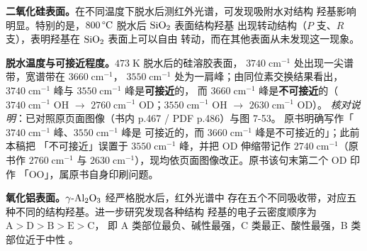 \begin{obs}
\textbf{二氧化硅表面。}在不同温度下脱水后测红外光谱，可发现吸附水对结构
羟基影响明显。特别的是，$800\,\degC$ 脱水后 $\ce{SiO2}$ 表面结构羟基
出现转动结构（$P$ 支、$R$ 支），表明羟基在 $\ce{SiO2}$ 表面上可以自由
转动，而在其他表面从未发现这一现象。

\textbf{脱水温度与可接近程度。}$473\;\mathrm{K}$ 脱水后的硅溶胶表面，
$3740\;\mathrm{cm^{-1}}$ 处出现一尖谱带，宽谱带在 $3660\;\mathrm{cm^{-1}}$，
$3550\;\mathrm{cm^{-1}}$ 处为一肩峰；由同位素交换结果看出，
$3740\;\mathrm{cm^{-1}}$ 峰与 $3550\;\mathrm{cm^{-1}}$ 峰是\textbf{可接近}的，
而 $3660\;\mathrm{cm^{-1}}$ 峰是\textbf{不可接近}的（$3740\;\mathrm{cm^{-1}}$
OH $\to$ $2760\;\mathrm{cm^{-1}}$ OD；$3550\;\mathrm{cm^{-1}}$ OH $\to$
$2630\;\mathrm{cm^{-1}}$ OD）。
\emph{核对说明}：已对照原页面图像（书内 p.467 / PDF p.486）与图 7-53。
原书明确写作「$3740\;\mathrm{cm^{-1}}$ 峰、$3550\;\mathrm{cm^{-1}}$ 峰是
可接近的，而 $3660\;\mathrm{cm^{-1}}$ 峰是不可接近的」；此前本稿把
「不可接近」误置于 $3550\;\mathrm{cm^{-1}}$ 峰，并把 OD 伸缩带记作
$2740\;\mathrm{cm^{-1}}$（原书作 $2760\;\mathrm{cm^{-1}}$ 与
$2630\;\mathrm{cm^{-1}}$），现均依页面图像改正。原书该句末第二个 OD 印作
「OO」，属原书自身印刷问题。

\textbf{氧化铝表面。}$\gamma\text{-}\ce{Al2O3}$ 经严格脱水后，红外光谱中
存在五个不同吸收带，对应五种不同的结构羟基。进一步研究发现各种结构
羟基的电子云密度顺序为 $\mathrm{A}>\mathrm{D}>\mathrm{B}>\mathrm{E}>\mathrm{C}$，
即 A 类部位最负、碱性最强，C 类最正、酸性最强，B 类部位近于中性
。


\end{obs}
